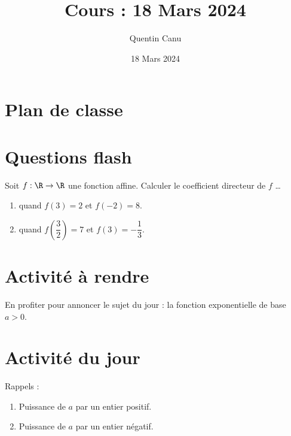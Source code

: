 \documentclass{article}
\title{Cours : 18 Mars 2024}
\date{18 Mars 2024}
\author{Quentin Canu}
\begin{document}
\maketitle

\section{Plan de classe}
\section{Questions flash}
Soit $f : \R \to \R$ une fonction affine. Calculer le coefficient directeur de $f$ \dots
\begin{enumerate}
\item quand $f(3)=2$ et $f(-2)=8$.
\item quand $f(\dfrac{3}{2})=7$ et $f(3)=-\dfrac{1}{3}$.
\end{enumerate}
\section{Activité à rendre}
En profiter pour annoncer le sujet du jour : la fonction exponentielle de base $a>0$.
\section{Activité du jour}
Rappels :
\begin{enumerate}
\item Puissance de $a$ par un entier positif.
\item Puissance de $a$ par un entier négatif. 
\end{enumerate}
\end{document}

